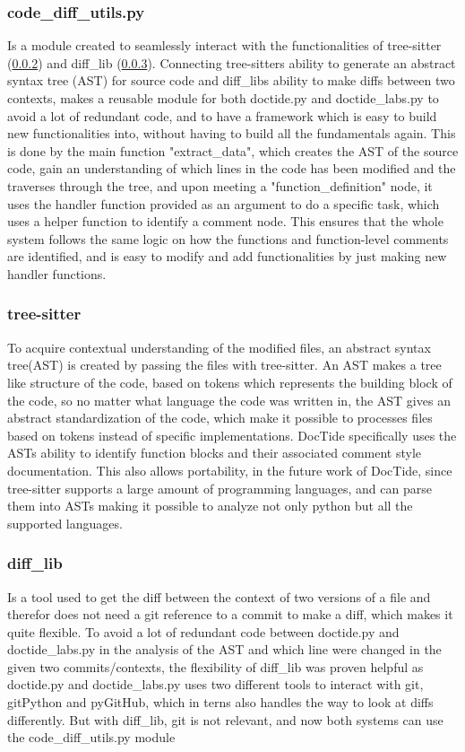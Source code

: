 \subsubsection{code\_diff\_utils.py}
Is a module created to seamlessly interact with the functionalities of tree-sitter (\ref{sec:tree-sitter}) and diff\_lib (\ref{sec:difflib}). Connecting tree-sitters ability to generate an abstract syntax tree (AST) for source code and diff\_libs ability to make diffs between two contexts, makes a reusable module for both doctide.py and doctide\_labs.py to avoid a lot of redundant code, and to have a framework which is easy to build new functionalities into, without having to build all the fundamentals again. This is done by the main function "extract\_data", which creates the AST of the source code, gain an understanding of which lines in the code has been modified and the traverses through the tree, and upon meeting a "function\_definition" node, it uses the handler function provided as an argument to do a specific task, which uses a helper function to identify a comment node. This ensures that the whole system follows the same logic on how the functions and function-level comments are identified, and is easy to modify and add functionalities by just making new handler functions.

\subsubsection{tree-sitter}
\label{sec:tree-sitter}
To acquire contextual understanding of the modified files, an abstract syntax tree(AST) is created by passing the files with tree-sitter. An AST makes a tree like structure of the code, based on tokens which represents the building block of the code, so no matter what language the code was written in, the AST gives an abstract standardization of the code, which make it possible to processes files based on tokens instead of specific implementations. DocTide specifically uses the ASTs ability to identify function blocks and their associated comment style documentation. This also allows portability, in the future work of DocTide, since tree-sitter supports a large amount of programming languages, and can parse them into ASTs making it possible to analyze not only python but all the supported languages.

\subsubsection{diff\_lib}
\label{sec:difflib}
Is a tool used to get the diff between the context of two versions of a file and therefor does not need a git reference to a commit to make a diff, which makes it quite flexible. To avoid a lot of redundant code between doctide.py and doctide\_labs.py in the analysis of the AST and which line were changed in the given two commits/contexts, the flexibility of diff\_lib was proven helpful as doctide.py and doctide\_labs.py uses two different tools to interact with git, gitPython and pyGitHub, which in terns also handles the way to look at diffs differently. But with diff\_lib, git is not relevant, and now both systems can use the code\_diff\_utils.py module


